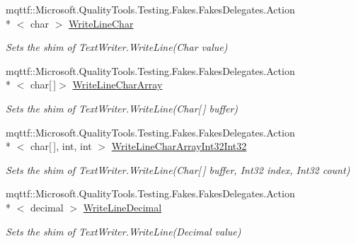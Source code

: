\begin{DoxyCompactItemize}
mqttf\-::\-Microsoft.\-Quality\-Tools.\-Testing.\-Fakes.\-Fakes\-Delegates.\-Action\\*
$<$ char $>$ \hyperlink{class_system_1_1_i_o_1_1_fakes_1_1_shim_text_writer_ad9ed651570fd5a0c597f557b41ef0378}{Write\-Line\-Char}
\begin{DoxyCompactList}\small\item\em Sets the shim of Text\-Writer.\-Write\-Line(\-Char value)\end{DoxyCompactList}\item 
mqttf\-::\-Microsoft.\-Quality\-Tools.\-Testing.\-Fakes.\-Fakes\-Delegates.\-Action\\*
$<$ char\mbox{[}$\,$\mbox{]}$>$ \hyperlink{class_system_1_1_i_o_1_1_fakes_1_1_shim_text_writer_a2fc885fa0ad5b50a8349e0a9daa8eb51}{Write\-Line\-Char\-Array}
\begin{DoxyCompactList}\small\item\em Sets the shim of Text\-Writer.\-Write\-Line(\-Char\mbox{[}$\,$\mbox{]} buffer)\end{DoxyCompactList}\item 
mqttf\-::\-Microsoft.\-Quality\-Tools.\-Testing.\-Fakes.\-Fakes\-Delegates.\-Action\\*
$<$ char\mbox{[}$\,$\mbox{]}, int, int $>$ \hyperlink{class_system_1_1_i_o_1_1_fakes_1_1_shim_text_writer_af362f220689b969d3d8919171cf2bcd5}{Write\-Line\-Char\-Array\-Int32\-Int32}
\begin{DoxyCompactList}\small\item\em Sets the shim of Text\-Writer.\-Write\-Line(\-Char\mbox{[}$\,$\mbox{]} buffer, Int32 index, Int32 count)\end{DoxyCompactList}\item 
mqttf\-::\-Microsoft.\-Quality\-Tools.\-Testing.\-Fakes.\-Fakes\-Delegates.\-Action\\*
$<$ decimal $>$ \hyperlink{class_system_1_1_i_o_1_1_fakes_1_1_shim_text_writer_aaf686313273e152346a09de3490636c3}{Write\-Line\-Decimal}
\begin{DoxyCompactList}\small\item\em Sets the shim of Text\-Writer.\-Write\-Line(\-Decimal value)\end{DoxyCompactList}\item 

\end{DoxyCompactItemize}
